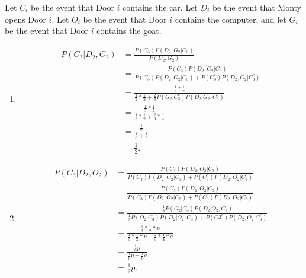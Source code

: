 Let $C_{i}$ be the event that Door $i$ contains the car. Let $D_{i}$ be the
event that Monty opens Door $i$. Let $O_{i}$ be the event that Door $i$
contains the computer, and let $G_{i}$ be the event that Door $i$ contains the
goat.

\begin{enumerate}[label=(\alph*)]
\item
\begin{align*}
P(C_{3}|D_{2}, G_{2}) &= \frac{P(C_{3})P(D_{2}, G_{2}|C_{3})}{P(D_{2}, G_{2})}
\\
&= \frac{P(C_{3})P(D_{2}, G_{2}|C_{3})}{P(C_{3})P(D_{2}, G_{2}|C_{3}) + P(C_{3}^
{c})P(D_{2}, G_{2}|C_{3}^{c})} \\
&= \frac{\frac{1}{3}*\frac{1}{2}}{\frac{1}{3}*\frac{1}{2} + \frac{2}{3}P(G_
{2}|C_{3}^{c})P(D_{2}|G_{2}, C_{3}^{c})} \\
&= \frac{\frac{1}{3}*\frac{1}{2}}{\frac{1}{3}*\frac{1}{2} + \frac{2}{3}*\frac{1}
{4}} \\
&= \frac{\frac{1}{6}}{\frac{1}{6} + \frac{1}{6}} \\ 
&= \frac{1}{2}.
\end{align*}

\item
\begin{align*}
P(C_{3}|D_{2}, O_{2}) &= \frac{P(C_{3})P(D_{2}, O_{2} | C_{3})}{P(C_{3})P(D_{2},
O_{2} | C_{3}) + P(C_{3}^{c})P(D_{2}, O_{2} | C_{3}^{c})} \\
&= \frac{P(C_{3})P(D_{2}, O_{2} | C_{3})}{P(C_{3})P(D_{2}, O_{2} | C_{3}) + P(C_
{3}^{c})P(D_{2}, O_{2} | C_{3}^{c})} \\
&= \frac{\frac{1}{3}P(O_{2}|C_{3})P(D_{2}|O_{2}, C_{3})}{\frac{1}{3}P(O_{2}|C_
{3})P(D_{2}|O_{2}, C_{3}) + P(C{3}^{c})P(D_{2}, O_{2} | C_{3}^{c})} \\
&= \frac{\frac{1}{3}*\frac{1}{2}*p}{\frac{1}{3}*\frac{1}{2}*p + \frac{2}
{3}*\frac{1}{4}*q} \\
&= \frac{\frac{1}{6}p}{\frac{1}{6}p + \frac{1}{6}q} \\
&= \frac{1}{2}p.
\end{align*}
\end{enumerate}